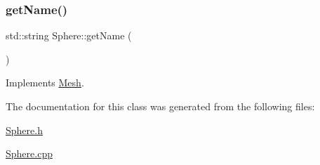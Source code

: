 \subsubsection{\texorpdfstring{getName()}{getName()}}
{\footnotesize\ttfamily std\+::string Sphere\+::get\+Name (\begin{DoxyParamCaption}{ }\end{DoxyParamCaption})\hspace{0.3cm}{\ttfamily [virtual]}}



Implements \mbox{\hyperlink{class_mesh_aa131fe1c2586fe60988155db77c57272}{Mesh}}.



The documentation for this class was generated from the following files\+:\begin{DoxyCompactItemize}
\item 
\mbox{\hyperlink{_sphere_8h}{Sphere.\+h}}\item 
\mbox{\hyperlink{_sphere_8cpp}{Sphere.\+cpp}}\end{DoxyCompactItemize}
